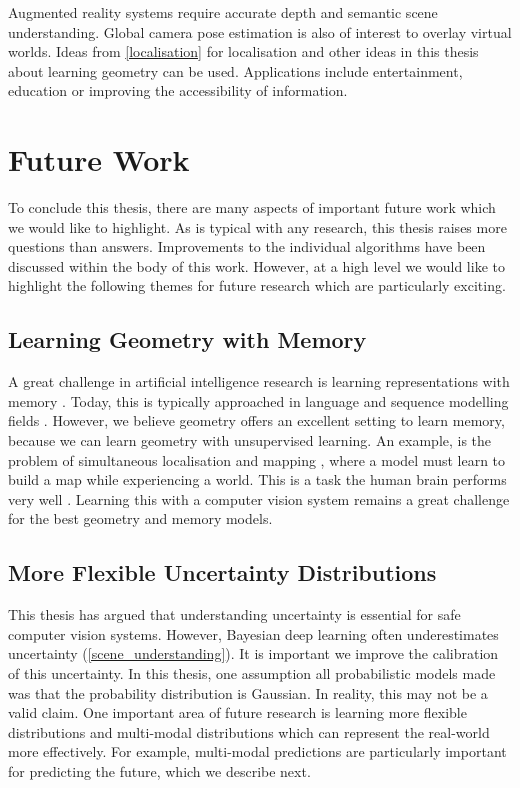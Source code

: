 Augmented reality systems require accurate depth and semantic scene understanding. Global camera pose estimation is also of interest to overlay virtual worlds. Ideas from \cref{localisation} for localisation and other ideas in this thesis about learning geometry can be used. Applications include entertainment, education or improving the accessibility of information.



\section{Future Work}

To conclude this thesis, there are many aspects of important future work which we would like to highlight. As is typical with any research, this thesis raises more questions than answers. Improvements to the individual algorithms have been discussed within the body of this work. However, at a high level we would like to highlight the following themes for future research which are particularly exciting.

\subsection{Learning Geometry with Memory}
A great challenge in artificial intelligence research is learning representations with memory \citep{graves2014neural}. Today, this is typically approached in language and sequence modelling fields \citep{weston2014memory}. However, we believe geometry offers an excellent setting to learn memory, because we can learn geometry with unsupervised learning. An example, is the problem of simultaneous localisation and mapping \citep{durrant2006simultaneous}, where a model must learn to build a map while experiencing a world. This is a task the human brain performs very well \citep{moser2008place,o1978hippocampus}. Learning this with a computer vision system remains a great challenge for the best geometry and memory models.

\subsection{More Flexible Uncertainty Distributions}
This thesis has argued that understanding uncertainty is essential for safe computer vision systems. However, Bayesian deep learning often underestimates uncertainty (\cref{scene_understanding}). It is important we improve the calibration of this uncertainty. In this thesis, one assumption all probabilistic models made was that the probability distribution is Gaussian. In reality, this may not be a valid claim. One important area of future research is learning more flexible distributions and multi-modal distributions which can represent the real-world more effectively. For example, multi-modal predictions are particularly important for predicting the future, which we describe next.

